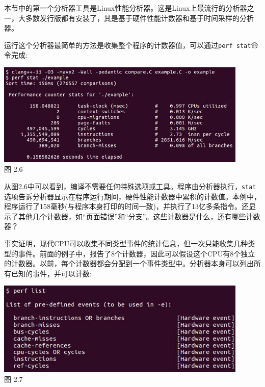 本节中的第一个分析器工具是Linux性能分析器。这是Linux上最流行的分析器之一，大多数发行版都有安装了，其是基于硬件性能计数器和基于时间采样的分析器。

运行这个分析器最简单的方法是收集整个程序的计数器值，可以通过\texttt{perf stat}命令完成:

\begin{center}
\includegraphics[width=0.9\textwidth]{content/1/chapter2/images/6.jpg}\\
图 2.6
\end{center}

从图2.6中可以看到，编译不需要任何特殊选项或工具。程序由分析器执行，\texttt{stat}选项告诉分析器显示在程序运行期间，硬件性能计数器中累积的计数值。本例中，程序运行了158毫秒(与程序本身打印的时间一致)，并执行了13亿多条指令。还显示了其他几个计数器，如“页面错误”和“分支”。这些计数器是什么，还有哪些计数器？

事实证明，现代CPU可以收集不同类型事件的统计信息，但一次只能收集几种类型的事件。前面的例子中，报告了8个计数器，因此可以假设这个CPU有8个独立的计数器。以前，每个计数器都会分配到一个事件类型中。分析器本身可以列出所有已知的事件，并可以计数:

\begin{center}
\includegraphics[width=0.9\textwidth]{content/1/chapter2/images/7.jpg}\\
图 2.7
\end{center}

